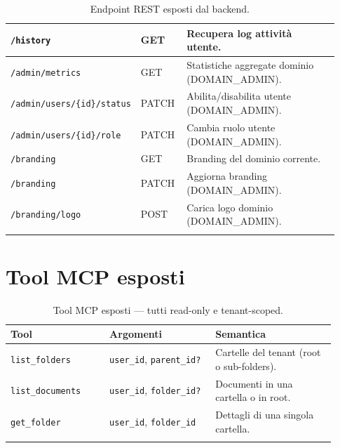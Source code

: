 \begin{longtable}{p{0.32\linewidth} p{0.14\linewidth} p{0.47\linewidth}}
\texttt{/history}                             & GET    & Recupera log attivit\`a utente. \\
\midrule
\texttt{/admin/metrics}                       & GET    & Statistiche aggregate dominio (DOMAIN\_ADMIN). \\
\texttt{/admin/users/\{id\}/status}           & PATCH  & Abilita/disabilita utente (DOMAIN\_ADMIN). \\
\texttt{/admin/users/\{id\}/role}             & PATCH  & Cambia ruolo utente (DOMAIN\_ADMIN). \\
\midrule
\texttt{/branding}                            & GET    & Branding del dominio corrente. \\
\texttt{/branding}                            & PATCH  & Aggiorna branding (DOMAIN\_ADMIN). \\
\texttt{/branding/logo}                       & POST   & Carica logo dominio (DOMAIN\_ADMIN). \\
\bottomrule
\caption{Endpoint REST esposti dal backend.}
\label{tab:endpoints_full}
\end{longtable}

\section*{Tool MCP esposti}

\begin{longtable}{p{0.28\linewidth} p{0.30\linewidth} p{0.34\linewidth}}
\toprule
\textbf{Tool} & \textbf{Argomenti} & \textbf{Semantica} \\
\midrule
\endhead
\texttt{list\_folders}   & \texttt{user\_id}, \texttt{parent\_id?} & Cartelle del tenant (root o sub-folders). \\
\texttt{list\_documents} & \texttt{user\_id}, \texttt{folder\_id?} & Documenti in una cartella o in root. \\
\texttt{get\_folder}     & \texttt{user\_id}, \texttt{folder\_id}  & Dettagli di una singola cartella. \\
\bottomrule
\caption{Tool MCP esposti --- tutti read-only e tenant-scoped.}
\label{tab:mcp_tools}
\end{longtable}
